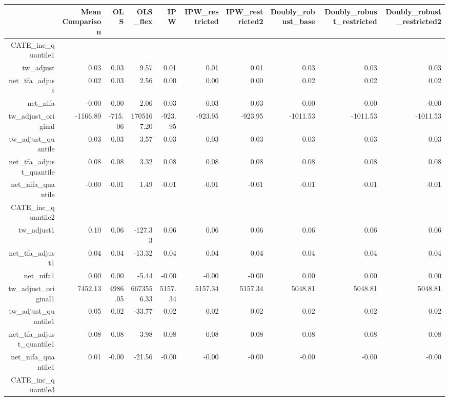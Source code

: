 \documentclass[10pt,a4paper]{article}
\begin{document}
\begin{landscape}
\begin{table}[ht]
\centering
\begin{tabular}{rrrrrrrrrr}
  \hline
 & Mean Comparison & OLS & OLS\_flex & IPW & IPW\_restricted & IPW\_restricted2 & Doubly\_robust\_base & Doubly\_robust\_restricted & Doubly\_robust\_restricted2 \\ 
  \hline
CATE\_inc\_quantile1 &  &  &  &  &  &  &  &  &  \\ 
  tw\_adjust & 0.03 & 0.03 & 9.57 & 0.01 & 0.01 & 0.01 & 0.03 & 0.03 & 0.03 \\ 
  net\_tfa\_adjust & 0.02 & 0.03 & 2.56 & 0.00 & 0.00 & 0.00 & 0.02 & 0.02 & 0.02 \\ 
  net\_nifa & -0.00 & -0.00 & 2.06 & -0.03 & -0.03 & -0.03 & -0.00 & -0.00 & -0.00 \\ 
  tw\_adjust\_original & -1166.89 & -715.06 & 1705167.20 & -923.95 & -923.95 & -923.95 & -1011.53 & -1011.53 & -1011.53 \\ 
  tw\_adjust\_quantile & 0.03 & 0.03 & 3.57 & 0.03 & 0.03 & 0.03 & 0.03 & 0.03 & 0.03 \\ 
  net\_tfa\_adjust\_quantile & 0.08 & 0.08 & 3.32 & 0.08 & 0.08 & 0.08 & 0.08 & 0.08 & 0.08 \\ 
  net\_nifa\_quantile & -0.00 & -0.01 & 1.49 & -0.01 & -0.01 & -0.01 & -0.01 & -0.01 & -0.01 \\ 
  CATE\_inc\_quantile2 &  &  &  &  &  &  &  &  &  \\ 
  tw\_adjust1 & 0.10 & 0.06 & -127.33 & 0.06 & 0.06 & 0.06 & 0.06 & 0.06 & 0.06 \\ 
  net\_tfa\_adjust1 & 0.04 & 0.04 & -13.32 & 0.04 & 0.04 & 0.04 & 0.04 & 0.04 & 0.04 \\ 
  net\_nifa1 & 0.00 & 0.00 & -5.44 & -0.00 & -0.00 & -0.00 & 0.00 & 0.00 & 0.00 \\ 
  tw\_adjust\_original1 & 7452.13 & 4986.05 & 6673556.33 & 5157.34 & 5157.34 & 5157.34 & 5048.81 & 5048.81 & 5048.81 \\ 
  tw\_adjust\_quantile1 & 0.05 & 0.02 & -33.77 & 0.02 & 0.02 & 0.02 & 0.02 & 0.02 & 0.02 \\ 
  net\_tfa\_adjust\_quantile1 & 0.08 & 0.08 & -3.98 & 0.08 & 0.08 & 0.08 & 0.08 & 0.08 & 0.08 \\ 
  net\_nifa\_quantile1 & 0.01 & -0.00 & -21.56 & -0.00 & -0.00 & -0.00 & -0.00 & -0.00 & -0.00 \\ 
  CATE\_inc\_quantile3 &  &  &  &  &  &  &  &  &  \\ 

\end{tabular}
\end{table}
\end{landscape}
\end{document}
